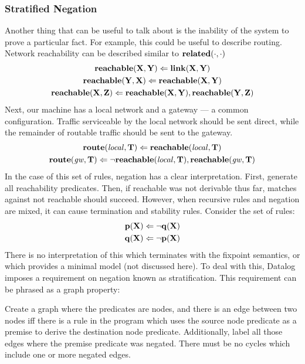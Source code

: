 \subsubsection{Stratified Negation}
Another thing that can be useful to talk about is the inability of the system to prove a particular fact.
For example, this could be useful to describe routing.
Network reachability can be described similar to ${\bf related}(\cdot, \cdot)$
\begin{gather*}
        {\bf reachable}({\bf X}, {\bf Y}) \Leftarrow {\bf link}({\bf X}, {\bf Y})\\
        {\bf reachable}({\bf Y}, {\bf X}) \Leftarrow {\bf reachable}({\bf X}, {\bf Y})\\
        {\bf reachable}({\bf X}, {\bf Z}) \Leftarrow {\bf reachable}({\bf X}, {\bf Y}), {\bf reachable}({\bf Y}, {\bf Z})
\end{gather*}
Next, our machine has a local network and a gateway --- a common configuration.
Traffic serviceable by the local network should be sent direct, while the remainder of routable traffic should be sent to the gateway.
\begin{gather*}
        {\bf route}({\it local}, {\bf T}) \Leftarrow {\bf reachable}({\it local}, {\bf T})\\
        {\bf route}({\it gw}, {\bf T}) \Leftarrow \neg {\bf reachable}({\it local}, {\bf T}), {\bf reachable}({\it gw}, {\bf T})
\end{gather*}
In the case of this set of rules, negation has a clear interpretation.
First, generate all reachability predicates.
Then, if reachable was not derivable thus far, matches against not reachable should succeed.
However, when recursive rules and negation are mixed, it can cause termination and stability rules. Consider the set of rules:
\begin{gather*}
        {\bf p}({\bf X}) \Leftarrow \neg {\bf q}({\bf X})\\
        {\bf q}({\bf X}) \Leftarrow \neg {\bf p}({\bf X})
\end{gather*}
There is no interpretation of this which terminates with the fixpoint semantics, or which provides a minimal model (not discussed here).
To deal with this, Datalog imposes a requirement on negation known as stratification.
This requirement can be phrased as a graph property:

Create a graph where the predicates are nodes, and there is an edge between two nodes iff there is a rule in the program which uses the source node predicate as a premise to derive the destination node predicate.
Additionally, label all those edges where the premise predicate was negated.
There must be no cycles which include one or more negated edges.

